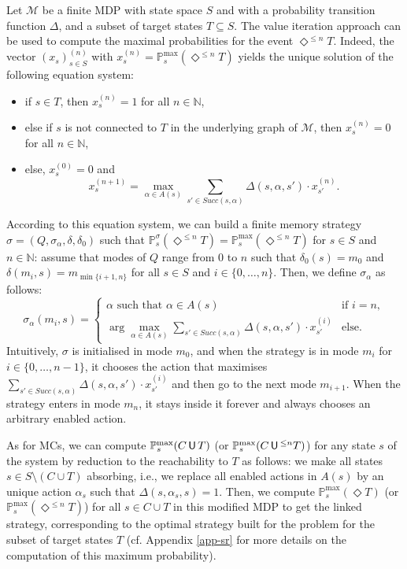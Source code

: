 \begin{theorem}
  Let $\mathcal{M}$ be a finite MDP with state space $S$ and with a probability transition function $\Delta$, and a subset of target states $T \subseteq S$. The value iteration approach can be used to compute the maximal probabilities for the event $\Diamond^{\leq n}T$.
  Indeed, the vector $(x_s)^{(n)}_{s \in S}$ with $x_s^{(n)} = \mathbb{P}^{\max}_s(\Diamond^{\leq n} T)$ yields the unique solution of the following equation system:
  \begin{itemize}
    \item if $s \in T$, then $x_s^{(n)}=1$ for all $n \in \mathbb{N}$,
    \item else if $s$ is not connected to $T$ in the underlying graph of $\mathcal{M}$, then $x_s^{(n)}=0$
    for all $n \in \mathbb{N}$,
    \item else, $x_s^{(0)} = 0$ and
    \[ x_s^{(n+1)} = \max_{\alpha \in A(s)} \sum_{s' \in Succ(s, \alpha)} \Delta(s, \alpha, s') \cdot x_{s'}^{(n)}. \]
  \end{itemize}
  According to this equation system, we can build a finite memory strategy $\sigma = (Q, \sigma_\alpha, \delta, \delta_0)$ such that $\mathbb{P}^\sigma_s(\Diamond^{\leq n} T) = \mathbb{P}^{\max}_s(\Diamond^{\leq n} T)$ for $s \in S$ and $n \in \mathbb{N}$:
  assume that modes of $Q$ range from $0$ to $n$ such that $\delta_0(s) = m_0$ and $\delta(m_i, s) = m_{\min\{i+1, n\}}$ for all $s \in S$ and $i \in \{0, \dots, n\}$. Then, we define $\sigma_\alpha$ as follows:
  \[
    \sigma_\alpha(m_i, s) =
    \begin{cases}
      \alpha \text{ such that } \alpha \in A(s) &\text{if }i = n,\\
      \arg \max_{\alpha \in A(s)} \sum_{s' \in Succ(s, \alpha)} \Delta(s, \alpha, s') \cdot x_{s'}^{(i)}
      & \text{else.}
    \end{cases}
  \]
  Intuitively, $\sigma$ is initialised in mode $m_0$, and when the strategy is in mode $m_i$ for $i \in \{0, \dots, n-1\}$,
  it chooses the action that maximises $\sum_{s' \in Succ(s, \alpha)} \Delta(s, \alpha, s') \cdot x_{s'}^{(i)}$ and then go to the next mode $m_{i+1}$. When the strategy enters in mode $m_n$, it stays inside it forever and always chooses an arbitrary enabled action.
\end{theorem}
As for MCs, we can compute $\mathbb{P}_s^{\max}(C \,\text{\sffamily U}\, T)$ (or $\mathbb{P}_s^{\max}(C \,\text{\sffamily U}\,^{\leq n} T)$) for any state $s$ of the system by reduction to the reachability to $T$ as follows:
we make all states $s \in S \setminus (C \cup T)$ absorbing, i.e., we replace all enabled actions in $A(s)$
by an unique action $\alpha_s$ such that $\Delta(s, \alpha_s, s) = 1$.
Then, we compute $\mathbb{P}^{\max}_s(\Diamond T)$ (or $\mathbb{P}^{\max}_s(\Diamond^{\leq n} T)$) for all $s \in C \cup T$ in this modified MDP to get the linked
strategy, corresponding to the optimal strategy built for the \SR{} problem for the subset of target states $T$ (cf. Appendix \ref{app-sr} for more details on the computation of this maximum probability).

